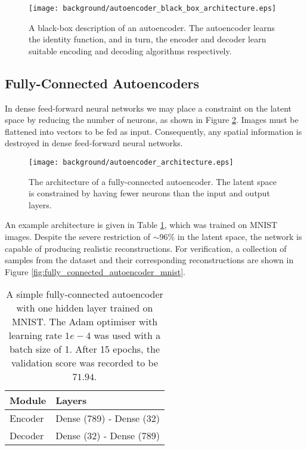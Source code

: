 \begin{figure}[h!]
\centering
\captionsetup{justification=centering}
\texttt{[image: background/autoencoder\_black\_box\_architecture.eps]}
\caption{A black-box description of an autoencoder. The autoencoder learns the identity function, and in turn, the encoder and decoder learn suitable encoding and decoding algorithms respectively.}
\label{fig:autoencoder_black_box_architecture}
\end{figure}

\subsection{Fully-Connected Autoencoders}

In dense feed-forward neural networks we may place a constraint on the latent space by reducing the number of neurons, as shown in Figure \ref{fig:autoencoder_architecture}. Images must be flattened into vectors to be fed as input. Consequently, any spatial information is destroyed in dense feed-forward neural networks.

\begin{figure}[h!]
\centering
\captionsetup{justification=centering}
\texttt{[image: background/autoencoder\_architecture.eps]}
\caption{The architecture of a fully-connected autoencoder. The latent space is constrained by having fewer neurons than the input and output layers.}
\label{fig:autoencoder_architecture}
\end{figure}

An example architecture is given in Table \ref{tab:fully_connected_autoencoder_architecture}, which was trained on MNIST images. Despite the severe restriction of $\sim96\%$ in the latent space, the network is capable of producing realistic reconstructions. For verification, a collection of samples from the dataset and their corresponding reconstructions are shown in Figure \ref{fig:fully_connected_autoencoder_mnist}.

\begin{table}[]
\centering
\captionsetup{justification=centering}
\label{tab:fully_connected_autoencoder_architecture}
\begin{tabular}{@{}ll@{}}
\toprule
\textbf{Module} & \textbf{Layers} \\ \midrule
Encoder & Dense (789) - Dense (32) \\
Decoder & Dense (32) - Dense (789) \\ \bottomrule
\end{tabular}
\caption{A simple fully-connected autoencoder with one hidden layer trained on MNIST. The Adam optimiser with learning rate $1e-4$ was used with a batch size of 1. After 15 epochs, the validation score was recorded to be $71.94$.}
\end{table}

